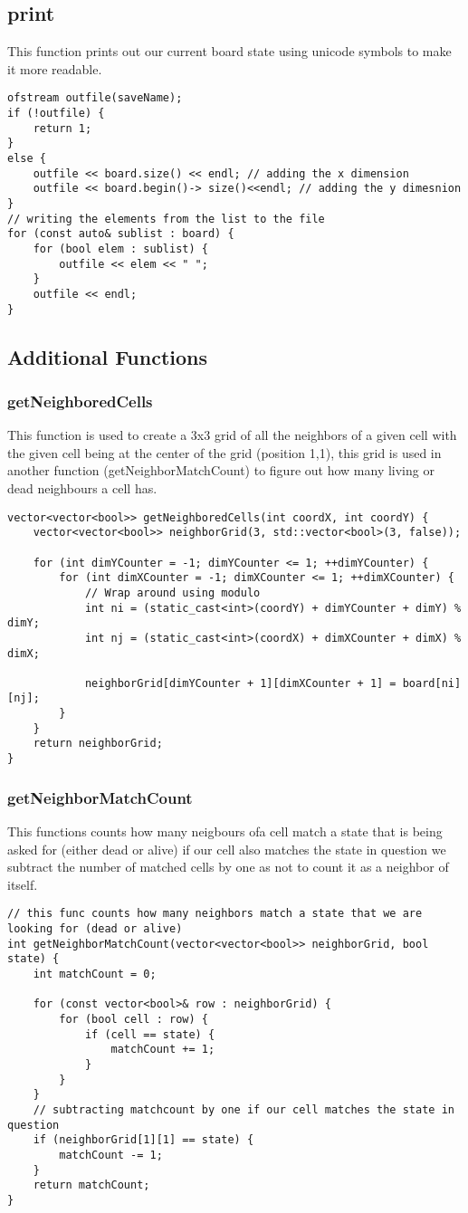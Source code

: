 \documentclass[a4paper]{article}
\begin{document}
\subsection{print}
This function prints out our current board state using unicode symbols to make it more readable.
\begin{lstlisting}
ofstream outfile(saveName);
if (!outfile) {
    return 1;
}
else {
    outfile << board.size() << endl; // adding the x dimension
    outfile << board.begin()-> size()<<endl; // adding the y dimesnion
}
// writing the elements from the list to the file
for (const auto& sublist : board) {
    for (bool elem : sublist) {
        outfile << elem << " ";
    }
    outfile << endl;
}
\end{lstlisting}
\subsection{Additional Functions}
\subsubsection{getNeighboredCells}
This function is used to create a 3x3 grid of all the neighbors of a given cell with the given cell being at the center of the grid (position 1,1), this grid is used in another function (getNeighborMatchCount) to figure out how many living or dead neighbours a cell has.
\begin{lstlisting}
vector<vector<bool>> getNeighboredCells(int coordX, int coordY) {
    vector<vector<bool>> neighborGrid(3, std::vector<bool>(3, false));

    for (int dimYCounter = -1; dimYCounter <= 1; ++dimYCounter) {
        for (int dimXCounter = -1; dimXCounter <= 1; ++dimXCounter) {
            // Wrap around using modulo
            int ni = (static_cast<int>(coordY) + dimYCounter + dimY) % dimY;
            int nj = (static_cast<int>(coordX) + dimXCounter + dimX) % dimX;

            neighborGrid[dimYCounter + 1][dimXCounter + 1] = board[ni][nj];
        }
    }
    return neighborGrid;
}
\end{lstlisting}
\clearpage
\subsubsection{getNeighborMatchCount}
This functions counts how many neigbours ofa cell match a state that is being asked for (either dead or alive) if our cell also matches the state in question we subtract the number of matched cells by one as not to count it as a neighbor of itself.
\begin{lstlisting}
// this func counts how many neighbors match a state that we are looking for (dead or alive)
int getNeighborMatchCount(vector<vector<bool>> neighborGrid, bool state) {
    int matchCount = 0;

    for (const vector<bool>& row : neighborGrid) {
        for (bool cell : row) {
            if (cell == state) {
                matchCount += 1;
            }
        }
    }
    // subtracting matchcount by one if our cell matches the state in question
    if (neighborGrid[1][1] == state) {
        matchCount -= 1;
    }
    return matchCount;
}
\end{lstlisting}
\end{document}

